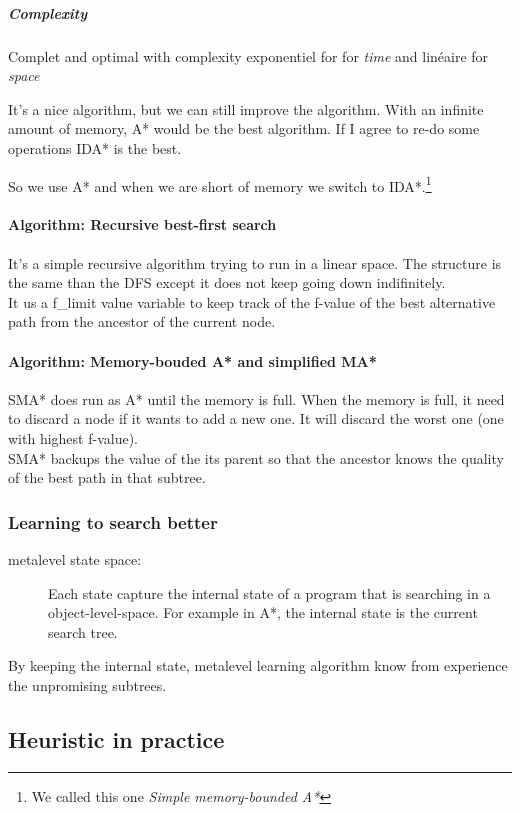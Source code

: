 \subparagraph{Complexity} Complet and  optimal with  complexity exponentiel for  for \textit{time}
and linéaire for \textit{space} 

It's a nice  algorithm, but we can still improve  the algorithm. With an
infinite amount of memory, A* would be the best algorithm. If I agree to
re-do  some operations  IDA* is  the  best. 

So  we  use A*  and when  we
are  short of  memory we  switch  to IDA*.\footnote{We  called this  one
\textit{Simple memory-bounded A*}}



\paragraph{Algorithm: Recursive best-first search}
It's a simple recursive algorithm trying to run in a linear space. The structure is 
the same than the DFS except it does not keep going down indifinitely.\\
It us a f\_limit value variable to keep track of the f-value of the best alternative path
from the ancestor of the current node.


\paragraph{Algorithm: Memory-bouded A* and simplified MA*}
SMA* does run as A* until the memory is full. When the memory is full, it need to discard a 
node if it wants to add a new one. It will discard the worst one (one with highest f-value).\\
SMA* backups the value of the its parent so that the ancestor knows the quality of the best
path in that subtree.


\subsubsection{Learning to search better}
\begin{description}
\item [metalevel state space:] Each state capture the internal state of a program that is searching in
a object-level-space. For example in A*, the internal state is the current search tree.
\end{description}
By keeping the internal state, metalevel learning algorithm know from experience the unpromising 
subtrees.

\subsection{Heuristic in practice}

